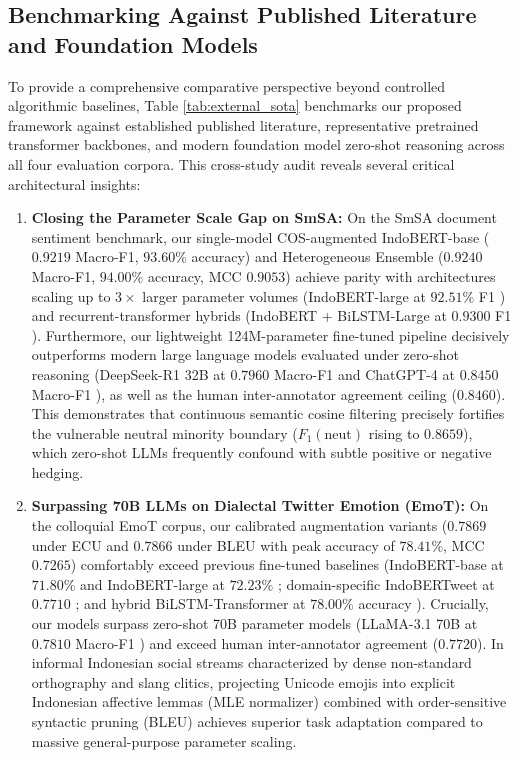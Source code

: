 \documentclass{ieeeaccess}
\begin{document}
\subsection{Benchmarking Against Published Literature and Foundation Models}
\label{subsec:published_sota_benchmarking}

To provide a comprehensive comparative perspective beyond controlled algorithmic baselines, Table \ref{tab:external_sota} benchmarks our proposed framework against established published literature, representative pretrained transformer backbones, and modern foundation model zero-shot reasoning across all four evaluation corpora. This cross-study audit reveals several critical architectural insights:
\begin{enumerate}
    \item \textbf{Closing the Parameter Scale Gap on SmSA:} On the SmSA document sentiment benchmark, our single-model COS-augmented IndoBERT-base (\textbf{$0.9219$} Macro-F1, \textbf{$93.60\%$} accuracy) and Heterogeneous Ensemble (\textbf{$0.9240$} Macro-F1, \textbf{$94.00\%$} accuracy, MCC \textbf{$0.9053$}) achieve parity with architectures scaling up to $3\times$ larger parameter volumes (IndoBERT-large at $92.51\%$ F1 \cite{wilie2020indonlu}) and recurrent-transformer hybrids (IndoBERT + BiLSTM-Large at $0.9300$ F1 \cite{ahmadian2024hybrid}). Furthermore, our lightweight 124M-parameter fine-tuned pipeline decisively outperforms modern large language models evaluated under zero-shot reasoning (DeepSeek-R1 32B at $0.7960$ Macro-F1 and ChatGPT-4 at $0.8450$ Macro-F1 \cite{nasution2025benchmarking}), as well as the human inter-annotator agreement ceiling ($0.8460$). This demonstrates that continuous semantic cosine filtering precisely fortifies the vulnerable neutral minority boundary ($F_1(\text{neut})$ rising to \textbf{$0.8659$}), which zero-shot LLMs frequently confound with subtle positive or negative hedging.
    \item \textbf{Surpassing 70B LLMs on Dialectal Twitter Emotion (EmoT):} On the colloquial EmoT corpus, our calibrated augmentation variants (\textbf{$0.7869$} under ECU and \textbf{$0.7866$} under BLEU with peak accuracy of \textbf{$78.41\%$}, MCC \textbf{$0.7265$}) comfortably exceed previous fine-tuned baselines (IndoBERT-base at $71.80\%$ and IndoBERT-large at $72.23\%$ \cite{wilie2020indonlu}; domain-specific IndoBERTweet at $0.7710$ \cite{koto2020indolem}; and hybrid BiLSTM-Transformer at $78.00\%$ accuracy \cite{ahmadian2024hybrid}). Crucially, our models surpass zero-shot 70B parameter models (LLaMA-3.1 70B at $0.7810$ Macro-F1 \cite{nasution2025benchmarking}) and exceed human inter-annotator agreement ($0.7720$). In informal Indonesian social streams characterized by dense non-standard orthography and slang clitics, projecting Unicode emojis into explicit Indonesian affective lemmas (MLE normalizer) combined with order-sensitive syntactic pruning (BLEU) achieves superior task adaptation compared to massive general-purpose parameter scaling.

\end{enumerate}
\end{document}
